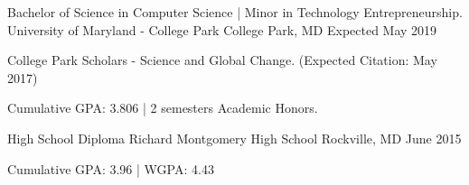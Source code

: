 

\begin{cventries}

  \cventry
    {Bachelor of Science in Computer Science  |  Minor in Technology Entrepreneurship.} %
    {University of Maryland - College Park} %
    {College Park, MD} %
    {Expected May 2019} %
    {
      \begin{cvitems} %
          \item {College Park Scholars - Science and Global Change. (Expected Citation: May 2017)}
          \item {Cumulative GPA: 3.806 | 2 semesters Academic Honors.}
      \end{cvitems}
    }
    
    \cventry
    {High School Diploma} %
    {Richard Montgomery High School} %
    {Rockville, MD} %
    {June 2015} %
    {
      \begin{cvitems} %
         \item {Cumulative GPA: 3.96 | WGPA: 4.43}
      \end{cvitems}
    }

\end{cventries}
